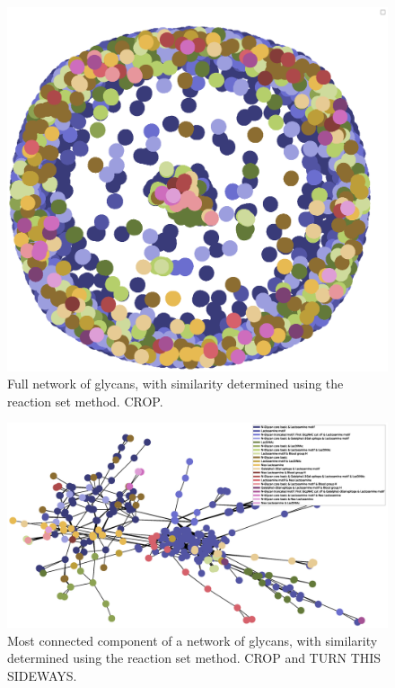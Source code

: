 \documentclass[12pt,a4paper]{article}
\begin{document}
\begin{figure}[H]
\centering 
\includegraphics[scale=0.5]{threshold_87_conn_comp_1_method_set/threshold_87_full_network_method_set.eps} 
\caption{Full network of glycans, with similarity determined using the reaction set method. CROP.}
\label{fig:threshold_87_full_network_method_set}
\end{figure}

\begin{figure}
\centering 
\includegraphics[scale=0.5]{threshold_87_conn_comp_1_method_set/threshold_87_conn_comp_1_method_set.eps} 
\caption{Most connected component of a network of glycans, with similarity determined using the reaction set method. CROP and TURN THIS SIDEWAYS.}
\label{fig:threshold_87_conn_comp_1_method_set}
\end{figure}
\clearpage
\end{document}
